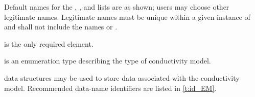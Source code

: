 \begin{notes}
\item Default names for the , , and
      lists are as shown; users may choose other legitimate names.
      Legitimate names must be unique within a given instance of
       and shall not include the names
       or .
\item {} is the only required element.
\end{notes}

 is an enumeration type describing
the type of conductivity model.

 data structures may be used to store data associated
with the conductivity model.
Recommended data-name identifiers are listed in \autoref{t:id_EM}.


